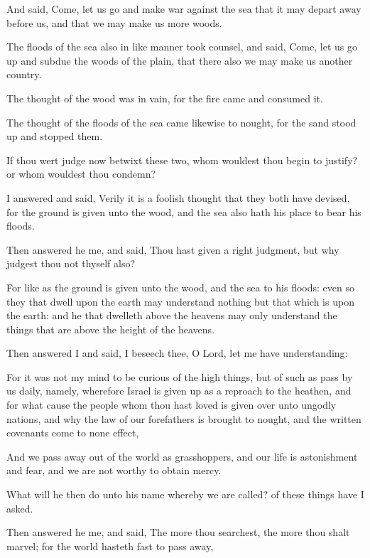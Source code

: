 {\par }{\PP {}And said, Come, let us go and make war against the sea that it may depart away before us, and that we may make us more woods.
\par }{\PP {}The floods of the sea also in like manner took counsel, and said, Come, let us go up and subdue the woods of the plain, that there also we may make us another country.
\par }{\PP {}The thought of the wood was in vain, for the fire came and consumed it.
\par }{\PP {}The thought of the floods of the sea came likewise to nought, for the sand stood up and stopped them.
\par }{\PP {}If thou wert judge now betwixt these two, whom wouldest thou begin to justify? or whom wouldest thou condemn?
\par }{\PP {}I answered and said, Verily it is a foolish thought that they both have devised, for the ground is given unto the wood, and the sea also hath his place to bear his floods.
\par }{\PP {}Then answered he me, and said, Thou hast given a right judgment, but why judgest thou not thyself also?
\par }{\PP {}For like as the ground is given unto the wood, and the sea to his floods: even so they that dwell upon the earth may understand nothing but that which is upon the earth: and he that dwelleth above the heavens may only understand the things that are above the height of the heavens.
\par }{\PP {}Then answered I and said, I beseech thee, O Lord, let me have understanding:
\par }{\PP {}For it was not my mind to be curious of the high things, but of such as pass by us daily, namely, wherefore Israel is given up as a reproach to the heathen, and for what cause the people whom thou hast loved is given over unto ungodly nations, and why the law of our forefathers is brought to nought, and the written covenants come to none effect,
\par }{\PP {}And we pass away out of the world as grasshoppers, and our life is astonishment and fear, and we are not worthy to obtain mercy.
\par }{\PP {}What will he then do unto his name whereby we are called? of these things have I asked.
\par }{\PP {}Then answered he me, and said, The more thou searchest, the more thou shalt marvel; for the world hasteth fast to pass away,
}
